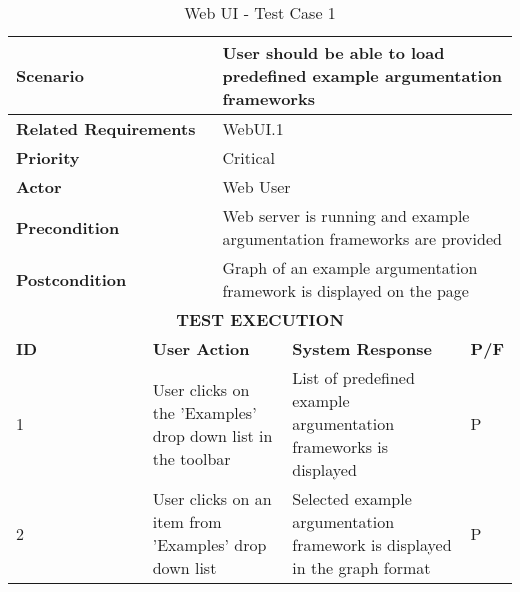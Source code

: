\renewcommand{\arraystretch}{1.5}
\begin{longtable}[c]{p{}|p{}|p{}|p{}|p{}}
	\caption{Web UI - Test Case 1}
	\label{table:testcase1}
	\\
	\hline
	\multicolumn{2}{p{0.3\textwidth}}{\textbf{Scenario}} & \multicolumn{3}{p{0.6\textwidth}}{User should be able to load predefined example argumentation frameworks} \\ 
	\hline
	\endfirsthead
	\endhead
	\multicolumn{2}{p{0.3\textwidth}}{\textbf{Related Requirements}} & \multicolumn{3}{p{0.6\textwidth}}{WebUI.1} \\ 
	\hline
	\multicolumn{2}{p{0.3\textwidth}}{\textbf{Priority}} & \multicolumn{3}{p{0.6\textwidth}}{Critical} \\ 
	\hline
	\multicolumn{2}{p{0.3\textwidth}}{\textbf{Actor}} & \multicolumn{3}{p{0.6\textwidth}}{Web User} \\ 
	\hline
	\multicolumn{2}{p{0.3\textwidth}}{\textbf{Precondition}} & \multicolumn{3}{p{0.6\textwidth}}{Web server is running and example argumentation frameworks are provided} \\ 
	\hline
	\multicolumn{2}{p{0.3\textwidth}}{\textbf{Postcondition}} & \multicolumn{3}{p{0.6\textwidth}}{Graph of an example argumentation framework is displayed on the page} \\ 
	\hline
	\multicolumn{5}{c}{\cellcolor{grey}\textbf{TEST EXECUTION}} \\ 
	\hline
	\textbf{ID} & \multicolumn{2}{|p{0.4\textwidth}|}{\textbf{User Action}} & \textbf{System Response} & \textbf{P/F} \\ 
	\hline
	1 & \multicolumn{2}{|p{0.4\textwidth}|}{User clicks on the 'Examples' drop down list in the toolbar} & List of predefined example argumentation frameworks is displayed & P \\ 
	\hline
	2 & \multicolumn{2}{|p{0.4\textwidth}|}{User clicks on an item from 'Examples' drop down list} & Selected example argumentation framework is displayed in the graph format & P \\ \hline 
\end{longtable}


